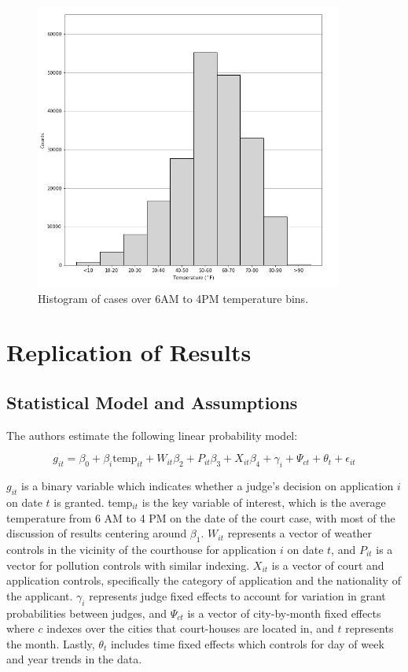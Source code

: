 \documentclass{article}
\begin{document}
	
	\begin{figure}[h!]
		\centering
		\caption{Histogram of cases over 6AM to 4PM temperature bins.}
		\includegraphics[width=0.9\textwidth]{paper_fig3.jpg}
		
		\label{fig:paper_fig3}
	\end{figure}
	
	\section{Replication of Results}
	\subsection{Statistical Model and Assumptions}
	The authors estimate the following linear probability model: 
	
	$$g_{it} = \beta_0 + \beta_i \text{temp}_{it} + W_{it}\beta_2 + P_{it}\beta_3 + X_{it} \beta_4 + \gamma_i + \Psi_{ct} + \theta_t + \epsilon_{it}$$
	
	$g_{it}$ is a binary variable which indicates whether a judge's decision on application $i$ on date $t$ is granted. temp$_{it}$ is the key variable of interest, which is the average temperature from 6 AM to 4 PM on the date of the court case, with most of the discussion of results centering around $\beta_1$. $W_{it}$ represents a vector of weather controls in the vicinity of the courthouse for application $i$ on date $t$, and $P_{it}$ is a vector for pollution controls with similar indexing. $X_{it}$ is a vector of court and application controls, specifically the category of application and the nationality of the applicant. $\gamma_i$ represents judge fixed effects to account for variation in grant probabilities between judges, and $\Psi_{ct}$ is a vector of city-by-month fixed effects where $c$ indexes over the cities that court-houses are located in, and $t$ represents the month. Lastly, $\theta_t$ includes time fixed effects which controls for day of week and year trends in the data. 
	
\end{document}

